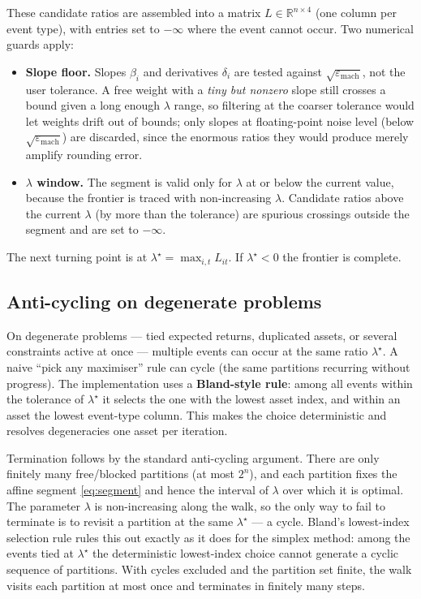 \documentclass[11pt]{article}
\newcommand{\R}{\mathbb{R}}
\begin{document}
These candidate ratios are assembled into a matrix $L\in\R^{n\times 4}$ (one column per
event type), with entries set to $-\infty$ where the event cannot occur. Two
numerical guards apply:

\begin{itemize}
\item \textbf{Slope floor.} Slopes $\beta_i$ and derivatives $\delta_i$ are tested
against $\sqrt{\varepsilon_{\text{mach}}}$, not the user tolerance. A free weight with a
\emph{tiny but nonzero} slope still crosses a bound given a long enough $\lambda$ range,
so filtering at the coarser tolerance would let weights drift out of bounds; only slopes
at floating-point noise level (below $\sqrt{\varepsilon_{\text{mach}}}$) are discarded,
since the enormous ratios they would produce merely amplify rounding error.

\item \textbf{$\lambda$ window.} The segment is valid only for $\lambda$ at or below the
current value, because the frontier is traced with non-increasing $\lambda$. Candidate
ratios above the current $\lambda$ (by more than the tolerance) are spurious crossings
outside the segment and are set to $-\infty$.
\end{itemize}

The next turning point is at $\lambda^{\star} = \max_{i,t} L_{it}$. If
$\lambda^{\star} < 0$ the frontier is complete.

\subsection{Anti-cycling on degenerate problems}
\label{sec:bland}

On degenerate problems --- tied expected returns, duplicated assets, or several
constraints active at once --- multiple events can occur at the same ratio
$\lambda^{\star}$. A naive ``pick any maximiser'' rule can cycle (the same partitions
recurring without progress). The implementation uses a \textbf{Bland-style rule}: among
all events within the tolerance of $\lambda^{\star}$ it selects the one with the lowest
asset index, and within an asset the lowest event-type column. This makes the choice
deterministic and resolves degeneracies one asset per iteration.

Termination follows by the standard anti-cycling argument. There are only finitely
many free/blocked partitions (at most $2^{n}$), and each partition fixes the affine
segment \eqref{eq:segment} and hence the interval of $\lambda$ over which it is
optimal. The parameter $\lambda$ is non-increasing along the walk, so the only way to
fail to terminate is to revisit a partition at the same $\lambda^{\star}$ --- a cycle.
Bland's lowest-index selection rule rules this out exactly as it does for the simplex
method: among the events tied at $\lambda^{\star}$ the deterministic lowest-index choice
cannot generate a cyclic sequence of partitions. With cycles excluded and the partition
set finite, the walk visits each partition at most once and terminates in finitely many
steps.
\end{document}
